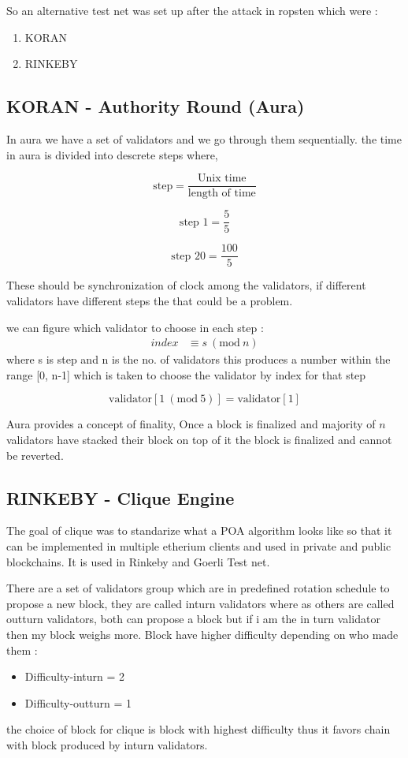 \documentclass[a4paper,12pt]{article}
\newcommand{\Mod}[1]{\ (\mathrm{mod}\ #1)}
\begin{document}
So an alternative test net was set up after the attack in ropsten which were : 
\begin{enumerate}
\item KORAN
    \item RINKEBY
\end{enumerate}



\setcounter{section}{0}
\subsection{KORAN - Authority Round (Aura)}

In aura we have a set of validators and we go through them sequentially. the time in aura is divided into descrete steps where,

\[
\text{step} = \frac{\text{Unix time}}{\text{length of time}}
\]

\[
\text{step 1} = \frac{5}{5}
\]

\[
\text{step 20} = \frac{100}{5}
\]

These should be synchronization of clock among the validators, if different validators have different steps the that could be a problem. 

we can figure which validator to choose in each step : 
\begin{align*}
  index &\equiv s \Mod{n}
\end{align*}
where s is step and n is the no. of validators 
this produces a number within the range [0, n-1]
which is taken to choose the validator by index for that step

\[
\text{validator}[ 1 \Mod{5}] = \text{validator}[1]
\]

Aura provides a concept of finality, Once a block is finalized and majority of $n$ validators have stacked their block on top of it the block is finalized and cannot be reverted.


\vspace{30pt}



\subsection{RINKEBY - Clique Engine}

The goal of clique was to standarize what a POA algorithm looks like so that it can be implemented in multiple etherium clients and used in private and public blockchains. It is used in Rinkeby and Goerli Test net.

There are a set of validators group which are in predefined rotation schedule to propose a new block, they are called inturn validators where as others are called outturn validators, both can propose a block but if i am the in turn validator then my block weighs more. Block have higher difficulty depending on who made them : 
\begin{itemize}
    \item Difficulty-inturn = 2
  \item Difficulty-outturn = 1 
\end{itemize}
  
the choice of block for clique is block with highest difficulty thus it favors chain with block produced by inturn validators.
\end{document}
